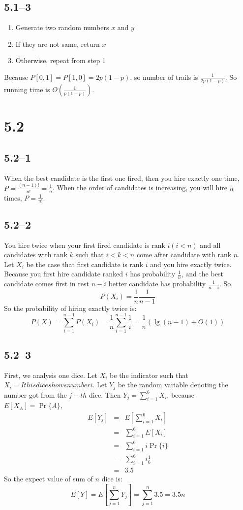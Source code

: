 \documentclass{article}
\begin{document}
\subsection*{5.1--3}
\begin{enumerate}
\item Generate two random numbers $x$ and $y$
\item If they are not same, return $x$
\item Otherwise, repeat from step 1
\end{enumerate}
Because $P[0, 1] = P[1, 0] = 2p(1-p)$, so number of trails is
$\frac{1}{2p(1-p)}$. So running time is $O(\frac{1}{p(1-p)})$.


\section*{5.2}
\subsection*{5.2--1}
When the best candidate is the first one fired, then you hire exactly one time,
$P = \frac{(n-1)!}{n!} = \frac{1}{n}$.  When the order of candidates is
increasing, you will hire $n$ times, $P = \frac{1}{n!}$.

\subsection*{5.2--2}
You hire twice when your first fired candidate is rank $i(i < n)$ and all candidates
with rank $k$ such that $i < k < n$ come after candidate with rank $n$.  Let
$X_i$ be the case that first candidate is rank $i$ and you hire exactly twice.
Because you first hire candidate ranked $i$ has probability $\frac{1}{n}$, and
the best candidate comes first in rest $n - i$ better candidate has probability
$\frac{1}{n - i}$. So, 
\[P(X_i) = \frac{1}{n}\frac{1}{n-1}\]
So the probability of hiring exactly twice is:
\[P(X) = \sum_{i = 1}^{n-1}P(X_i) = \frac{1}{n}\sum_{i = 1}^{n-1}\frac{1}{i}
  = \frac{1}{n}(\lg(n - 1) + O(1))\]

\subsection*{5.2--3}
First, we analysis one dice. Let $X_i $ be the indicator such that $X_i = I{this
dice shows number i}$. Let $Y_j$ be the random variable denoting the
number got from the $j-th$ dice. Then $Y_j = \sum_{i = 1}^6X_i$, because $E[X_A] =
\Pr\{A\}$,
\begin{eqnarray*}
   E[Y_j] &=& E[\sum_{i = 1}^6X_i] \\
        &=& \sum_{i = 1}^6E[X_i]\\
        &=& \sum_{i = 1}^6i\Pr\{i\}\\
        &=& \sum_{i = 1}^6i\frac{1}{6}\\
        &=& 3.5
\end{eqnarray*}
 So the expect value of sum of $n$ dice is:
\[E[Y] = E[\sum_{j = 1}^n Y_j] = \sum_{j = 1}^n3.5 = 3.5n\]
\end{document}
